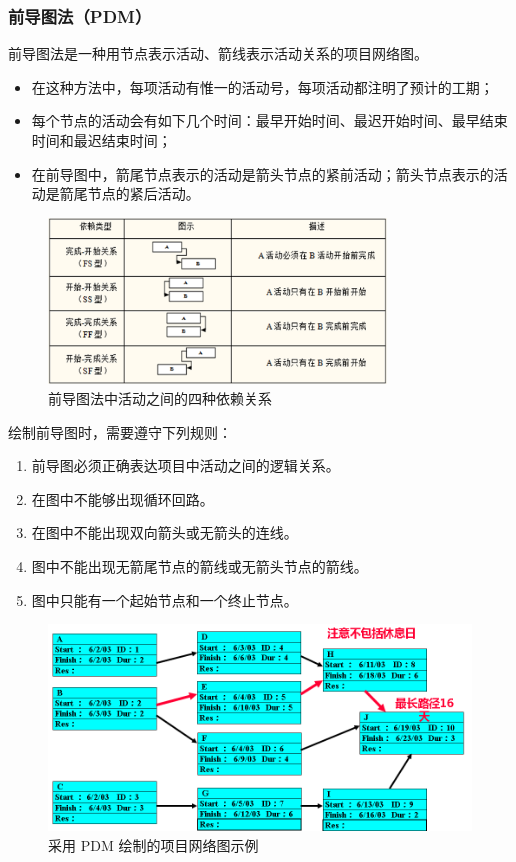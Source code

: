 \subsubsection{前导图法（PDM）}
前导图法是一种用节点表示活动、箭线表示活动关系的项目网络图。
\begin{itemize}
	\item 在这种方法中，每项活动有惟一的活动号，每项活动都注明了预计的工期；
	\item 每个节点的活动会有如下几个时间：最早开始时间、最迟开始时间、最早结束时间和最迟结束时间；
	\item 在前导图中，箭尾节点表示的活动是箭头节点的紧前活动；箭头节点表示的活动是箭尾节点的紧后活动。
\end{itemize}
\begin{figure}[!h]
	\centering
	\includegraphics[width=0.8\textwidth]{image/5-2}
	\caption{前导图法中活动之间的四种依赖关系}
\end{figure}
绘制前导图时，需要遵守下列规则：
\begin{enumerate}
	\item 前导图必须正确表达项目中活动之间的逻辑关系。
	\item 在图中不能够出现循环回路。
	\item 在图中不能出现双向箭头或无箭头的连线。
	\item 图中不能出现无箭尾节点的箭线或无箭头节点的箭线。
	\item 图中只能有一个起始节点和一个终止节点。 
\end{enumerate}
\begin{figure}[!h]
	\centering
	\includegraphics[width=\textwidth]{image/5-3}
	\caption{采用 PDM 绘制的项目网络图示例}
\end{figure}
